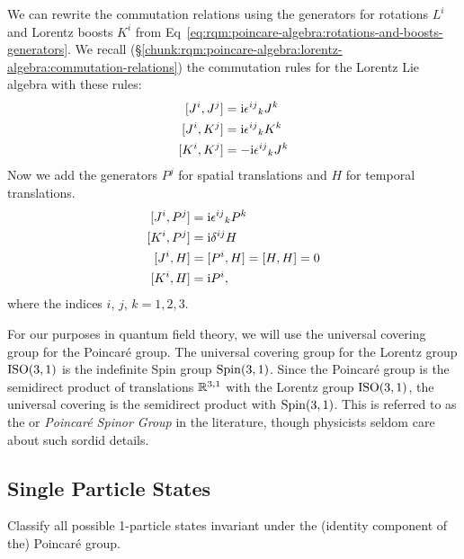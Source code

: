 \M
We can rewrite the commutation relations using the generators for
rotations $L^{i}$ and Lorentz boosts $K^{i}$ from
Eq~\eqref{eq:rqm:poincare-algebra:rotations-and-boosts-generators}.
We recall
(\S\ref{chunk:rqm:poincare-algebra:lorentz-algebra:commutation-relations})
the commutation rules for the Lorentz Lie algebra with these rules:
\begin{subequations}
\begin{align}
[J^{i}, J^{j}] &= \mathrm{i}{\epsilon^{ij}}_{k}J^{k}\\
[J^{i}, K^{j}] &= \mathrm{i}{\epsilon^{ij}}_{k}K^{k}\\
[K^{i}, K^{j}] &= -\mathrm{i}{\epsilon^{ij}}_{k}J^{k}
\end{align}
\end{subequations}
Now we add the generators $P^{j}$ for spatial translations and $H$ for
temporal translations.
\begin{subequations}
\begin{align}
[J^{i}, P^{j}] &= \mathrm{i}{\epsilon^{ij}}_{k}P^{k}\\
[K^{i}, P^{j}] &= \mathrm{i}\delta^{ij}H\\
[J^{i}, H] &= [P^{i}, H] = [H, H] = 0\\
[K^{i}, H] &= \mathrm{i} P^{i},
\end{align}
\end{subequations}
where the indices $i$, $j$, $k=1,2,3$.

\begin{ddanger}
For our purposes in quantum field theory, we will use the universal
covering group for the Poincar\'e group. The universal covering group
for the Lorentz group $\mathrm{ISO}(3,1)$ is the indefinite Spin group $\operatorname{Spin}(3,1)$.
Since the Poincar\'e group is the semidirect product of translations
$\mathbb{R}^{3,1}$ with the Lorentz group $\mathrm{ISO}(3,1)$, the universal covering
is the semidirect product with $\operatorname{Spin}(3,1)$. This is referred to as the
 or
\emph{Poincar\'e Spinor Group} in the literature, though physicists
seldom care about such sordid details. 
\end{ddanger}

\subsection{Single Particle States}

\begin{problem}
Classify all possible 1-particle states invariant under the (identity
component of the) Poincar\'e group.
\end{problem}

